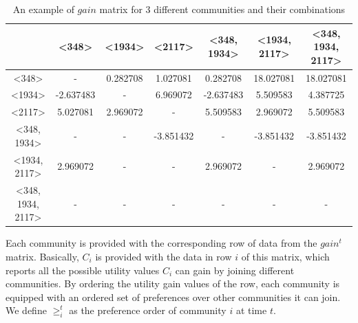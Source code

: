 \documentclass[11pt,onecolumn]{IEEEtran}
\begin{document}
\begin{table}[ht]
\caption{An example of $gain$ matrix for 3 different communities and their combinations} %
\centering %
{\renewcommand{\arraystretch}{1.2}
\begin{tabular}{c|c c c c c c} %
\hline\hline %
 & \textless348\textgreater & \textless1934\textgreater & \textless2117\textgreater & \textless348, 1934\textgreater & \textless1934, 2117\textgreater & \textless348, 1934, 2117\textgreater \\ [0.5ex] %
\hline %
\textless348\textgreater & - & 0.282708 & 1.027081 & 0.282708 & 18.027081 & 18.027081 \\
\textless1934\textgreater & -2.637483 & - & 6.969072 & -2.637483 & 5.509583 & 4.387725 \\
\textless2117\textgreater & 5.027081 & 2.969072 & - & 5.509583 & 2.969072 & 5.509583 \\
\textless348, 1934\textgreater & - & - & -3.851432 & - & -3.851432 & -3.851432 \\
\textless1934, 2117\textgreater & 2.969072 & - & - & 2.969072 & - & 2.969072 \\
\textless348, 1934, 2117\textgreater & - & - & - & - & - & - \\ [1ex] %
\hline %
\end{tabular}
}
\label{table:nonlin} %
\end{table}

Each community is provided with the corresponding row of data from the $gain^t$ matrix. Basically, $C_i$ is provided with the data in row $i$ of this matrix, which reports all the possible utility values $C_i$ can gain by joining different communities. By ordering the utility gain values of the row, each community is equipped with an ordered set of preferences over other communities it can join. We define $\geq_{i}^t$ as the preference order of community $i$ at time $t$.
\end{document}
